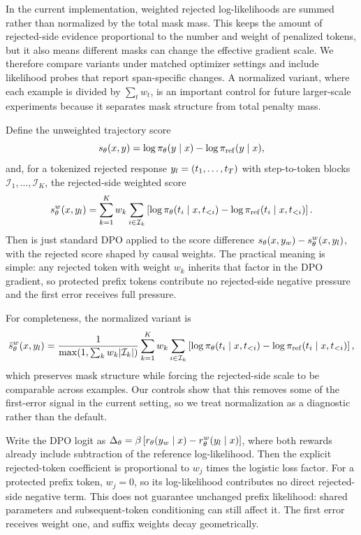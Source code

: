 In the current implementation, weighted rejected log-likelihoods are summed rather than normalized by the total mask mass. This keeps the amount of rejected-side evidence proportional to the number and weight of penalized tokens, but it also means different masks can change the effective gradient scale. We therefore compare variants under matched optimizer settings and include likelihood probes that report span-specific changes. A normalized variant, where each example is divided by $\sum_t w_t$, is an important control for future larger-scale experiments because it separates mask structure from total penalty mass.

Define the unweighted trajectory score
\begin{equation}
s_\theta(x,y)=\log \pi_\theta(y\mid x)-\log \pi_{\mathrm{ref}}(y\mid x),
\end{equation}
and, for a tokenized rejected response $y_l=(t_1,\ldots,t_T)$ with step-to-token blocks $\mathcal{I}_1,\ldots,\mathcal{I}_K$, the rejected-side weighted score
\begin{equation}
s_\theta^w(x,y_l)=\sum_{k=1}^K w_k \sum_{i\in\mathcal{I}_k}
\left[
\log \pi_\theta(t_i \mid x,t_{<i})
-\log \pi_{\mathrm{ref}}(t_i \mid x,t_{<i})
\right].
\end{equation}
Then \cmdpo{} is just standard DPO applied to the score difference $s_\theta(x,y_w)-s_\theta^w(x,y_l)$, with the rejected score shaped by causal weights. The practical meaning is simple: any rejected token with weight $w_k$ inherits that factor in the DPO gradient, so protected prefix tokens contribute no rejected-side negative pressure and the first error receives full pressure.

For completeness, the normalized variant is
\begin{equation}
\tilde s_\theta^w(x,y_l)
=
\frac{1}{\max(1,\sum_k w_k |\mathcal{I}_k|)}\sum_{k=1}^{K} w_k \sum_{i\in\mathcal{I}_k}
\left[
\log \pi_\theta(t_i \mid x,t_{<i})
-\log \pi_{\mathrm{ref}}(t_i \mid x,t_{<i})
\right],
\end{equation}
which preserves mask structure while forcing the rejected-side scale to be comparable across examples. Our controls show that this removes some of the first-error signal in the current setting, so we treat normalization as a diagnostic rather than the default.

Write the DPO logit as $\Delta_\theta = \beta\left[r_\theta(y_w\mid x)-r_\theta^w(y_l\mid x)\right]$, where both rewards already include subtraction of the reference log-likelihood. Then the explicit rejected-token coefficient is proportional to $w_j$ times the logistic loss factor. For a protected prefix token, $w_j=0$, so its log-likelihood contributes no direct rejected-side negative term. This does not guarantee unchanged prefix likelihood: shared parameters and subsequent-token conditioning can still affect it. The first error receives weight one, and suffix weights decay geometrically.

